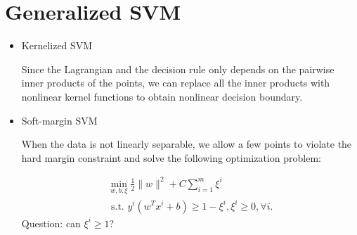 \documentclass[twoside,12pt]{article}
\begin{document}
\section{Generalized SVM}
\begin{itemize}
\item Kernelized SVM 

Since the Lagrangian and the decision rule only depends on the pairwise inner products of the points, we can replace all the inner products with nonlinear kernel functions to obtain nonlinear decision boundary.
\item Soft-margin SVM 

When the data is not linearly separable, we allow a few points to violate the hard margin constraint and solve the following optimization problem:

\begin{align*}
\min_{w,b,\xi} \frac 1 2 \|w\|^2 + C\sum_{i=1}^m \xi^i \\
\text{ s.t. }  y^i(w^Tx^i + b) \geq 1 - \xi^i, \xi^i \geq 0, \forall i.
\end{align*}
Question: can $\xi^i \geq 1$?

\end{itemize}
\end{document}
